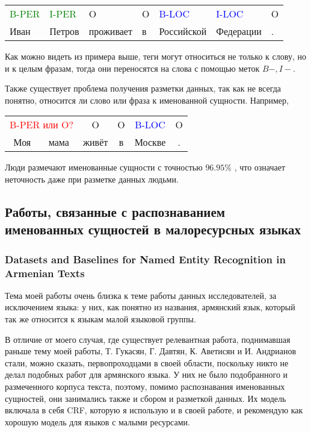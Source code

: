 \begin{tabular}[h]{lllllll}
\textcolor{green}{B-PER} & \textcolor{green}{I-PER} & O & O & \textcolor{blue}{B-LOC} &  \textcolor{blue}{I-LOC} & O \\
Иван & Петров & проживает & в & Российской & Федерации & . \\
\end{tabular}

Как можно видеть из примера выше, теги могут относиться не только к слову, но и к целым фразам, тогда они переносятся на слова с помощью меток $B-, I-$. 

Также существует проблема получения разметки данных, так как не всегда понятно, относится ли слово или фраза к именованной сущности. Например,

\begin{tabular}[h]{cccccc}
\multicolumn{2}{c}{\textcolor{red}{B-PER или O?}} & O & O & \textcolor{blue}{B-LOC} & O \\
Моя & мама & живёт & в & Москве & . \\
\end{tabular}

Люди размечают именованные сущности с точностью $96.95\%$ \cite{marsh-perzanowski-1998-muc}, что означает неточность даже при разметке данных людьми.


\subsection{Работы, связанные с распознаванием именованных сущностей в малоресурсных языках}

\subsubsection{Datasets and Baselines for Named Entity Recognition in Armenian Texts}

Тема моей работы очень близка к теме работы данных исследователей, за исключением языка: у них, как понятно из названия, армянский язык, который так же относится к языкам малой языковой группы.

В отличие от моего случая, где существует релевантная работа, поднимавшая раньше тему моей работы, Т. Гукасян, Г. Давтян, К. Аветисян и И. Андрианов стали, можно сказать, первопроходцами в своей области, поскольку никто не делал подобных работ для армянского языка. У них не было подобранного и размеченного корпуса текста, поэтому, помимо распознавания именованных сущностей, они занимались также и сбором и разметкой данных. Их модель включала в себя CRF, которую я использую и в своей работе, и рекомендую как хорошую модель для языков с малыми ресурсами.

